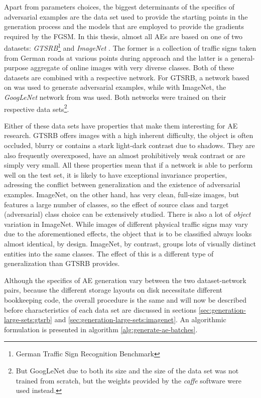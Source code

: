 \documentclass[11pt, a4paper]{article}
\begin{document}
Apart from parameters choices, the biggest determinants of the specifics of adversarial examples are the data set used to provide the starting points in the generation process and the models that are employed to provide the gradients required by the FGSM. In this thesis, almost all AEs are based on one of two datasets: \emph{GTSRB}\footnote{German Traffic Sign Recognition Benchmark} \cite{gtsrb-description} and \emph{ImageNet} \cite{imagenet-large-scale-hierarchical-image-database}. The former is a collection of traffic signs taken from German roads at various points during approach and the latter is a general-purpose aggregate of online images with very diverse classes. Both of these datasets are combined with a respective network. For GTSRB, a network based on \cite{multi-column-neural-network-gtsrb} was used to generate adversarial examples, while with ImageNet, the \emph{GoogLeNet} network from \cite{going-deeper-with-convolutions} was used. Both networks were trained on their respective data sets\footnote{But GoogLeNet due to both its size and the size of the data set was not trained from scratch, but the weights provided by the \emph{caffe} software were used instead.}.

Either of these data sets have properties that make them interesting for AE research. GTSRB offers images with a high inherent difficulty, the object is often occluded, blurry or contains a stark light-dark contrast due to shadows. They are also frequently overexposed, have an almost prohibitively weak contrast or are simply very small. All these properties mean that if a network is able to perform well on the test set, it is likely to have exceptional invariance properties, adressing the conflict between generalization and the existence of adversarial examples. ImageNet, on the other hand, has very clean, full-size images, but features a large number of classes, so the effect of source class and target (adversarial) class choice can be extensively studied. There is also a lot of \emph{object} variation in ImageNet. While images of different physical traffic signs may vary due to the aforementioned effects, the object that is to be classified always looks almost identical, by design. ImageNet, by contrast, groups lots of visually distinct entities into the same classes. The effect of this is a different type of generalization than GTSRB provides.

Although the specifics of AE generation vary between the two dataset-network pairs, because the different storage layouts on disk necessitate different bookkeeping code, the overall procedure is the same and will now be described before characteristics of each data set are discussed in sections \ref{sec:generation-large-sets:gtsrb} and \ref{sec:generation-large-sets:imagenet}. An algorithmic formulation is presented in algorithm \ref{alg:generate-ae-batches}.
\end{document}
